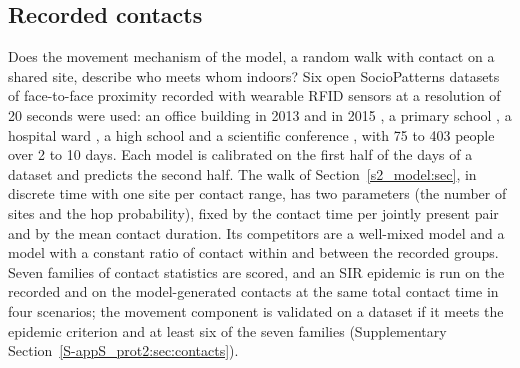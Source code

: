 \subsection{Recorded contacts}\label{s8b_evidence:sec:contacts}

Does the movement mechanism of the model, a random walk with contact on a shared site, describe who meets whom
indoors? Six open SocioPatterns datasets of face-to-face proximity recorded with wearable RFID sensors at a
resolution of 20 seconds \citep{cattuto2010dynamics} were used: an office building in 2013 and in 2015
\citep{genois2015data,genois2018can}, a primary school \citep{stehle2011high}, a hospital ward
\citep{vanhems2013estimating}, a high school \citep{mastrandrea2015contact} and a scientific conference
\citep{genois2018can,stehle2011simulation}, with 75 to 403 people over 2 to 10 days. Each model is calibrated on
the first half of the days of a dataset and predicts the second half. The walk of Section~\ref{s2_model:sec}, in
discrete time with one site per contact range, has two parameters (the number of sites and the hop
probability), fixed by the contact time per jointly present pair and by the mean contact duration. Its
competitors are a well-mixed model and a model with a constant ratio of contact within and between the recorded
groups. Seven families of contact statistics are scored, and an SIR epidemic is run on the recorded and on the
model-generated contacts at the same total contact time in four scenarios; the movement component is validated on
a dataset if it meets the epidemic criterion and at least six of the seven families
(Supplementary Section~\ref{S-appS_prot2:sec:contacts}).


